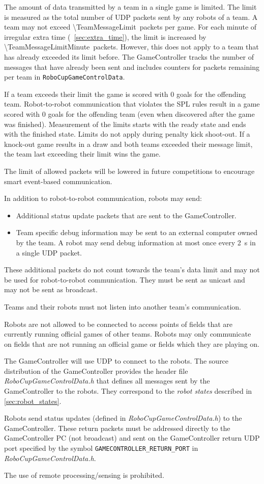 The amount of data transmitted by a team in a single game is limited. The limit is measured as the total number of UDP packets sent by any robots of a team. A team may not exceed \qty{\TeamMessageLimit}{packets} per game. For each minute of irregular extra time (\cf~\cref{sec:extra_time}), the limit is increased by \qty{\TeamMessageLimitMinute}{packets}. However, this does not apply to a team that has already exceeded its limit before. The GameController tracks the number of messages that have already been sent and includes counters for packets remaining per team in \texttt{RoboCupGameControlData}.

If a team exceeds their limit the game is scored with 0 goals for the offending team. Robot-to-robot communication that violates the SPL rules result in a game scored with 0 goals for the offending team (even when discovered after the game was finished). Measurement of the limits starts with the ready state and ends with the finished state. Limits do not apply during penalty kick shoot-out. If a knock-out game results in a draw and both teams exceeded their message limit, the team last exceeding their limit wins the game.

The limit of allowed packets will be lowered in future competitions to encourage smart event-based communication.

In addition to robot-to-robot communication, robots may send:
\begin{itemize}
 \item Additional status update packets that are sent to the GameController.
 \item Team specific debug information may be sent to an external computer owned by the team. A robot may send debug information at most once every \qty{2}{\second} in a single UDP packet.
\end{itemize}
These additional packets do not count towards the team's data limit and may not be used for robot-to-robot communication. They must be sent as unicast and may not be sent as broadcast.

Teams and their robots must not listen into another team's communication.

Robots are not allowed to be connected to access points of fields that are currently running official games of other teams.
Robots may only communicate on fields that are not running an official game or fields which they are playing on.

The GameController will use UDP to connect to the robots. The source distribution of the GameController provides the header file \emph{RoboCupGameControlData.h} that defines all messages sent by the GameController to the robots. They correspond to the \emph{robot states} described in \cref{sec:robot_states}.

Robots send status updates (defined in \emph{RoboCupGameControlData.h}) to the GameController. These return packets must be addressed directly to the GameController PC (\ie not broadcast) and sent on the GameController return UDP port specified by the symbol \verb!GAMECONTROLLER_RETURN_PORT! in \emph{RoboCupGameControlData.h}.

The use of remote processing/sensing is prohibited.
